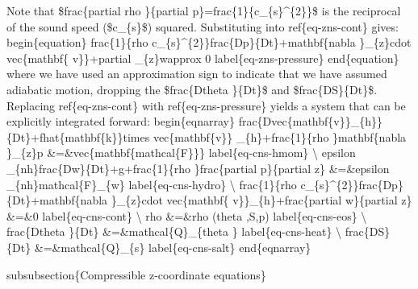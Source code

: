 \documentclass[letterpaper,10pt,english]{sphinxmanual}
\begin{document}
Note that \$frac\{partial rho \}\{partial p\}=frac\{1\}\{c\_\{s\}\textasciicircum{}\{2\}\}\$ is
the reciprocal of the sound speed (\$c\_\{s\}\$) squared. Substituting into
ref\{eq-zns-cont\} gives:
begin\{equation\}
frac\{1\}\{rho c\_\{s\}\textasciicircum{}\{2\}\}frac\{Dp\}\{Dt\}+mathbf\{nabla \}\_\{z\}cdot vec\{mathbf\{
v\}\}+partial \_\{z\}wapprox 0  label\{eq-zns-pressure\}
end\{equation\}
where we have used an approximation sign to indicate that we have assumed
adiabatic motion, dropping the \$frac\{Dtheta \}\{Dt\}\$ and \$frac\{DS\}\{Dt\}\$.
Replacing ref\{eq-zns-cont\} with ref\{eq-zns-pressure\} yields a system that
can be explicitly integrated forward:
begin\{eqnarray\}
frac\{Dvec\{mathbf\{v\}\}\_\{h\}\}\{Dt\}+fhat\{mathbf\{k\}\}times vec\{mathbf\{v\}\}
\_\{h\}+frac\{1\}\{rho \}mathbf\{nabla \}\_\{z\}p \&=\&vec\{mathbf\{mathcal\{F\}\}\}
label\{eq-cns-hmom\} \textbackslash{}
epsilon \_\{nh\}frac\{Dw\}\{Dt\}+g+frac\{1\}\{rho \}frac\{partial p\}\{partial z\}
\&=\&epsilon \_\{nh\}mathcal\{F\}\_\{w\}  label\{eq-cns-hydro\} \textbackslash{}
frac\{1\}\{rho c\_\{s\}\textasciicircum{}\{2\}\}frac\{Dp\}\{Dt\}+mathbf\{nabla \}\_\{z\}cdot vec\{mathbf\{
v\}\}\_\{h\}+frac\{partial w\}\{partial z\} \&=\&0  label\{eq-cns-cont\} \textbackslash{}
rho \&=\&rho (theta ,S,p)  label\{eq-cns-eos\} \textbackslash{}
frac\{Dtheta \}\{Dt\} \&=\&mathcal\{Q\}\_\{theta \}  label\{eq-cns-heat\} \textbackslash{}
frac\{DS\}\{Dt\} \&=\&mathcal\{Q\}\_\{s\}  label\{eq-cns-salt\}
end\{eqnarray\}

subsubsection\{Compressible z-coordinate equations\}
\end{document}
